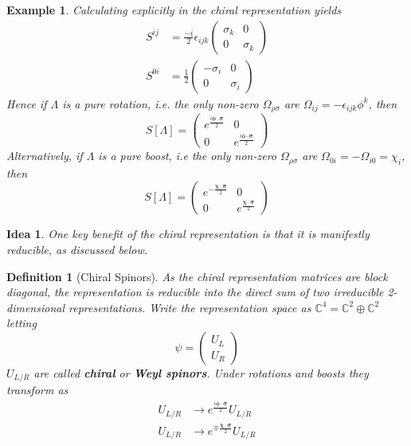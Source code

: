 \documentclass{article}
\newtheorem{definition}{Definition}[subsection]
\newtheorem*{idea}{Idea}
\newtheorem{example}{Example}[subsection]
\newcommand{\eps}{\epsilon}
\newcommand{\bam}[1]{\textbf{#1}}
\newcommand{\mbb}[1]{\mathbb{#1}}
\begin{document}
\begin{example}
Calculating explicitly in the chiral representation yields 
\begin{align*}
    S^{ij} &= \frac{-i}{2}\eps_{ijk} \begin{pmatrix} \sigma_k & 0 \\ 0 & \sigma_k \end{pmatrix} \\
    S^{0i} &= \frac{1}{2} \begin{pmatrix} -\sigma_i & 0 \\ 0 & \sigma_i \end{pmatrix}
\end{align*}
Hence if $\Lambda$ is a pure rotation, i.e. the only non-zero $\Omega_{\rho\sigma}$ are $\Omega_{ij}=-\eps_{ijk}\phi^k$, then 
\[
S[\Lambda]=\begin{pmatrix} e^{\frac{i\bm{\phi}\cdot\bm{\sigma}}{2}} & 0 \\ 0 & e^{\frac{i\bm{\phi}\cdot\bm{\sigma}}{2}} \end{pmatrix}
\]
Alternatively, if $\Lambda$ is a pure boost, i.e the only non-zero $\Omega_{\rho\sigma}$ are $\Omega_{0i}=-\Omega_{i0}=\chi_i$, then
\[
S[\Lambda]=\begin{pmatrix} e^{-\frac{\bm{\chi}\cdot\bm{\sigma}}{2}} & 0 \\ 0 & e^\frac{\bm{\chi}\cdot\bm{\sigma}}{2} \end{pmatrix}
\]
\end{example}

\begin{idea}
One key benefit of the chiral representation is that it is manifestly reducible, as discussed below.
\end{idea}

\begin{definition}[Chiral Spinors]
As the chiral representation matrices are block diagonal, the representation is reducible into the direct sum of two irreducible 2-dimensional representations. Write the representation space as $\mbb{C}^4=\mbb{C}^2\oplus\mbb{C}^2$ letting 
\[
\psi=\begin{pmatrix} U_L \\ U_R \end{pmatrix}
\]
$U_{L/R}$ are called \bam{chiral} or \bam{Weyl spinors}. Under rotations and boosts they transform as 
\begin{align*}
    U_{L/R} &\to e^{\frac{i\bm{\phi}\cdot\bm{\sigma}}{2}} U_{L/R} \\ 
    U_{L/R} &\to e^{\mp\frac{\bm{\chi}\cdot\bm{\sigma}}{2}} U_{L/R}
\end{align*}
\end{definition}
\end{document}
